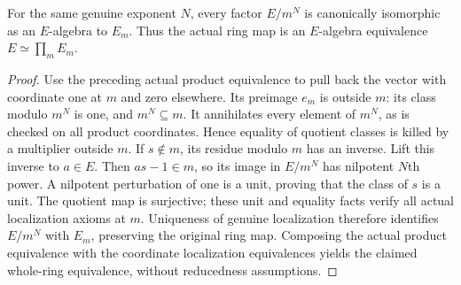 \begin{theorem}
\label{algebra:artinian-localization-decomposition}
\leanok
{}
For the same genuine exponent $N$, every factor $E/m^N$ is canonically
isomorphic as an $E$-algebra to $E_m$. Thus the actual ring map is an
$E$-algebra equivalence $E\simeq\prod_m E_m$.
\end{theorem}
\begin{proof}
Use the preceding actual product equivalence to pull back the vector
with coordinate one at $m$ and zero elsewhere. Its preimage $e_m$ is
outside $m$: its class modulo $m^N$ is one, and $m^N\subseteq m$.
It annihilates every element of $m^N$, as is checked on all product
coordinates. Hence equality of quotient classes is killed by a
multiplier outside $m$.
If $s\notin m$, its residue modulo $m$ has an inverse. Lift this inverse
to $a\in E$. Then $as-1\in m$, so its image in $E/m^N$ has nilpotent
$N$th power. A nilpotent perturbation of one is a unit, proving that
the class of $s$ is a unit. The quotient map is surjective; these unit
and equality facts verify all actual localization axioms at $m$.
Uniqueness of genuine localization therefore identifies $E/m^N$ with
$E_m$, preserving the original ring map. Composing the actual product
equivalence with the coordinate localization equivalences yields the
claimed whole-ring equivalence, without reducedness assumptions.
\end{proof}

